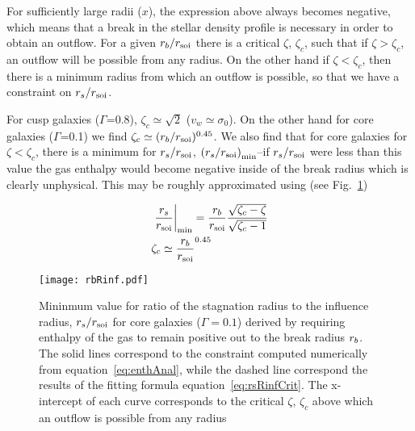 For sufficiently large radii ($x$), the expression above always
becomes negative, which means that a break in the stellar density
profile is necessary in order to obtain an outflow. For a given
$r_b/r_{\rm soi}$ there is a critical $\zeta$, $\zeta_{c}$, such that if
$\zeta>\zeta_c$, an outflow will be possible from any
radius. On the other hand if $\zeta<\zeta_c$, then there is a
minimum radius from which an outflow is possible, so that we have a
constraint on $r_s/r_{\rm soi}$. 

For cusp galaxies ($\Gamma$=0.8), $\zeta_c\simeq \sqrt 2$
($v_w\simeq\sigma_0$).  On the other hand for core galaxies
($\Gamma$=0.1) we find $\zeta_c\simeq (r_b/r_{\rm soi})^{0.45}$. We also
find that for core galaxies for $\zeta<\zeta_c$, there is a minimum
for $r_s/r_{\rm soi}$, $\left(r_s/r_{\rm soi}\right)_{\rm min}$--if $r_s/r_{\rm soi}$ were
less than this value the gas enthalpy would become negative inside of
the break radius which is clearly unphysical.  This may be roughly
approximated using (see Fig.~\ref{fig:rbRinf})

\begin{align}
&\left.\frac{r_s}{r_{\rm soi}}\right|_{\rm min}=\frac{r_b}{r_{\rm soi}} \frac{\sqrt{\zeta_c-\zeta}}{\sqrt{\zeta_c-1}}\nonumber\\
&\zeta_c\simeq \frac{r_b}{r_{\rm soi}}^{0.45}
\label{eq:rsRinfCrit}
\end{align}


\begin{figure}
\texttt{[image: rbRinf.pdf]}
\caption{\label{fig:rbRinf} Mininmum value for ratio of the stagnation
  radius to the influence radius, $r_s/r_{\rm soi}$ for core galaxies
  ($\Gamma=0.1$) derived by requiring enthalpy of the gas to remain
  positive out to the break radius $r_b$. The solid lines correspond
  to the constraint computed numerically from
  equation~\eqref{eq:enthAnal}, while the dashed line correspond the
  results of the fitting formula equation~\eqref{eq:rsRinfCrit}. The
  x-intercept of each curve corresponds to the critical $\zeta$,
  $\zeta_c$ above which an outflow is possible from any radius}
\end{figure}


